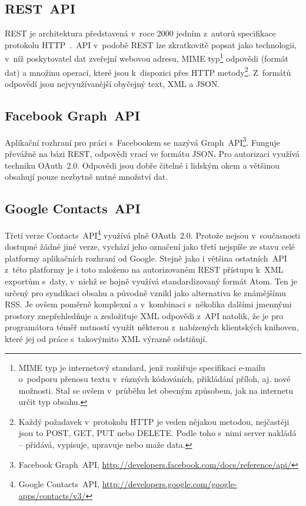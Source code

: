 \documentclass[12pt,oneside,final]{fithesis2}
\begin{document}
\subsection{REST~API}
REST je architektura představená v~roce 2000 jedním z~autorů specifikace protokolu HTTP~\cite{fielding2000architectural}.~API v~podobě REST lze zkratkovitě popsat jako technologii, v~níž poskytovatel dat zveřejní webovou adresu, MIME typ\footnote{MIME typ je internetový standard, jenž rozšiřuje specifikaci e-mailu o~podporu přenosu textu v~různých kódováních, přikládání příloh, aj. nové možnosti. Stal se ovšem v~průběhu let obecným způsobem, jak na internetu určit typ obsahu.} odpovědi (formát dat) a množinu operací, které jsou k~dispozici přes HTTP metody\footnote{Každý požadavek v~protokolu HTTP je veden nějakou metodou, nejčastěji jsou to POST, GET, PUT nebo DELETE. Podle toho s~nimi server nakládá -- přidává, vypisuje, upravuje nebo maže data.}. Z~formátů odpovědí jsou nej\-využívanější obyčejný text, XML a JSON.

\subsection{Facebook Graph~API}
Aplikační rozhraní pro práci s~Facebookem se nazývá Graph~API\footnote{Facebook Graph~API, \url{http://developers.facebook.com/docs/reference/api/}}. Funguje převážně na bázi REST, odpovědi vrací ve formátu JSON. Pro autorizaci využívá techniku OAuth~2.0. Odpovědi jsou dobře čitelné i lidským okem a většinou obsahují pouze nezbytně nutné množství dat.

\subsection{Google Contacts~API}
Třetí verze Contacts~API\footnote{Google Contacts~API, \url{http://developers.google.com/google-apps/contacts/v3/}} využívá plně OAuth~2.0. Protože nejsou v~současnosti dostupné žádné jiné verze, vychází jeho označení jako třetí nejspíše ze stavu celé platformy aplikačních rozhraní od Google. Stejně jako i většina ostatních~API z~této platformy je i toto založeno na autorizovaném REST přístupu k~XML exportům s~daty, v~nichž se hojně využívá standardizovaný formát Atom. Ten je určený pro syndikaci obsahu a původně vznikl jako alternativa ke známějšímu RSS. Je ovšem poměrně komplexní a v~kombinaci s~několika dalšími jmennými prostory znepřehledňuje a zesložiťuje XML odpovědi z~API natolik, že je pro programátora téměř nutností využít některou z~nabízených klientských knihoven, které jej od práce s~takovýmito XML výrazně odstiňují.
\end{document}

